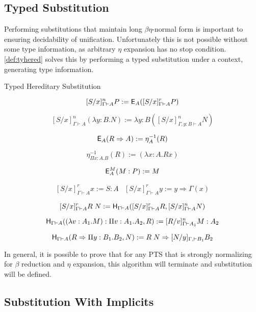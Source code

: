 \subsection{Typed Substitution}

Performing substitutions that maintain long $\beta\eta$-normal 
form is important to ensuring decidability of unification.  
Unfortunately this is not possible without some type information, 
as arbitrary $\eta$ expansion has no stop condition. \ref{def:tyhered} solves this by performing
a typed substitution under a context, generating type information.

\begin{definition}
Typed Hereditary Substitution

\[
[S / x]^n_{\Gamma \vdash A} P := \mathsf{E}_A([S / x]^r_{\Gamma \vdash A} P)
\]

\[
[S / x]^n_{\Gamma \vdash A} (\lambda y : B . N) := \lambda y:B ([S / x ]^n_{\Gamma, y: B \vdash A} N)
\]

\[
\mathsf{E}_A(R \Rightarrow A) := \eta^{-1}_A (R)
\]

\[
\eta^{-1}_{\Pi x : A . B}(R) := (\lambda x : A . R x)
\]

\[
\mathsf{E}^M_A(M : P) := M
\]

\[ \begin{array}{lr}
[ S / x ]^r_{\Gamma \vdash A} x := S : A
&
[S / x]^r_{\Gamma \vdash A} y := y \Rightarrow \Gamma(x)
\end{array} \] 

\[
[S / x]^r_{\Gamma \vdash A} R\;N := 
\mathsf{H}_{\Gamma \vdash A} ([S/x]^r_{\Gamma \vdash A} R, [S/x]^n_{\Gamma \vdash A} N) 
\]

\[
\mathsf{H}_{\Gamma \vdash A} ((\lambda v : A_1 . M) : \Pi v : A_1 . A_2 , R) 
:= 
[R/v]^n_{\Gamma \vdash A_1} M : A_2
\]

\[
\mathsf{H}_{\Gamma \vdash A}(R \Rightarrow \Pi y : B_1 . B_2 , N) 
:= 
R\; N \Rightarrow [N/y]_{\Gamma,\vdash B_1}B_2
\]

\label{def:tyhered}
\end{definition}

In general, it is possible to prove that for any PTS that is strongly normalizing for $\beta$ reduction and 
$\eta$ expansion, this algorithm will terminate and substitution will be defined. 



\subsection{Substitution With Implicits}

